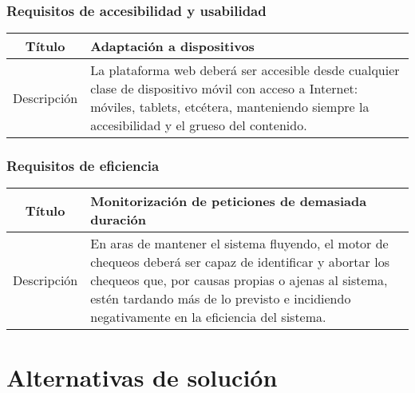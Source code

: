 \FloatBarrier
\subsubsection{Requisitos de accesibilidad y usabilidad}

\begin{center}
  
  \begin{tabularx}{\textwidth}{|c|X|}
    \hline
    Título & Adaptación a dispositivos \\

    \hline

    Descripción & La plataforma web deberá ser accesible desde cualquier clase
    de dispositivo móvil con acceso a Internet: móviles, tablets, etcétera,
    manteniendo siempre la accesibilidad y el grueso del contenido. \\

    \hline
  \end{tabularx}
  \label{tab:accesibilidad}
\end{center}


\FloatBarrier
\subsubsection{Requisitos de eficiencia}

\begin{center}
  
  \begin{tabularx}{\textwidth}{|c|X|}
    \hline
    Título & Monitorización de peticiones de demasiada duración \\

    \hline

    Descripción & En aras de mantener el sistema fluyendo, el motor de chequeos
    deberá ser capaz de identificar y abortar los chequeos que, por causas
    propias o ajenas al sistema, estén tardando más de lo previsto e incidiendo
    negativamente en la eficiencia del sistema. \\

    \hline
  \end{tabularx}
\end{center}

\section{Alternativas de solución}
\label{sec:alternativas-solucion}

